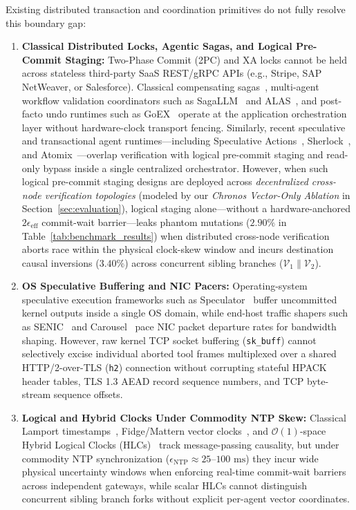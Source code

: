 \documentclass[conference,10pt]{IEEEtran}
\begin{document}
Existing distributed transaction and coordination primitives do not fully resolve this boundary gap:
\begin{enumerate}
    \item \textbf{Classical Distributed Locks, Agentic Sagas, and Logical Pre-Commit Staging:} Two-Phase Commit (2PC) and XA locks cannot be held across stateless third-party SaaS REST/gRPC APIs (e.g., Stripe, SAP NetWeaver, or Salesforce). Classical compensating sagas~\cite{garcia1987sagas}, multi-agent workflow validation coordinators such as SagaLLM~\cite{chang2025sagallm} and ALAS~\cite{geng2025alas}, and post-facto undo runtimes such as GoEX~\cite{patil2024goex} operate at the application orchestration layer without hardware-clock transport fencing. Similarly, recent speculative and transactional agent runtimes---including Speculative Actions~\cite{ye2025speculative}, Sherlock~\cite{ro2025sherlock}, and Atomix~\cite{mohammadi2026atomix}---overlap verification with logical pre-commit staging and read-only bypass inside a single centralized orchestrator. However, when such logical pre-commit staging designs are deployed across \emph{decentralized cross-node verification topologies} (modeled by our \emph{Chronos Vector-Only Ablation} in Section~\ref{sec:evaluation}), logical staging alone---without a hardware-anchored $2\epsilon_{\text{eff}}$ commit-wait barrier---leaks phantom mutations ($2.90\%$ in Table~\ref{tab:benchmark_results}) when distributed cross-node verification aborts race within the physical clock-skew window and incurs destination causal inversions ($3.40\%$) across concurrent sibling branches ($\mathcal{V}_1 \parallel \mathcal{V}_2$).
    \item \textbf{OS Speculative Buffering and NIC Pacers:} Operating-system speculative execution frameworks such as Speculator~\cite{nightingale2005speculator} buffer uncommitted kernel outputs inside a single OS domain, while end-host traffic shapers such as SENIC~\cite{radhakrishnan2014senic} and Carousel~\cite{saeed2017carousel} pace NIC packet departure rates for bandwidth shaping. However, raw kernel TCP socket buffering (\texttt{sk\_buff}) cannot selectively excise individual aborted tool frames multiplexed over a shared HTTP/2-over-TLS (\texttt{h2}) connection without corrupting stateful HPACK header tables, TLS 1.3 AEAD record sequence numbers, and TCP byte-stream sequence offsets.
    \item \textbf{Logical and Hybrid Clocks Under Commodity NTP Skew:} Classical Lamport timestamps~\cite{lamport1978time}, Fidge/Mattern vector clocks~\cite{fidge1988timestamps, mattern1988virtual}, and $\mathcal{O}(1)$-space Hybrid Logical Clocks (HLCs)~\cite{kulkarni2014hlc} track message-passing causality, but under commodity NTP synchronization ($\epsilon_{\text{NTP}} \approx 25\text{--}100\text{ ms}$) they incur wide physical uncertainty windows when enforcing real-time commit-wait barriers across independent gateways, while scalar HLCs cannot distinguish concurrent sibling branch forks without explicit per-agent vector coordinates.
\end{enumerate}
\end{document}
